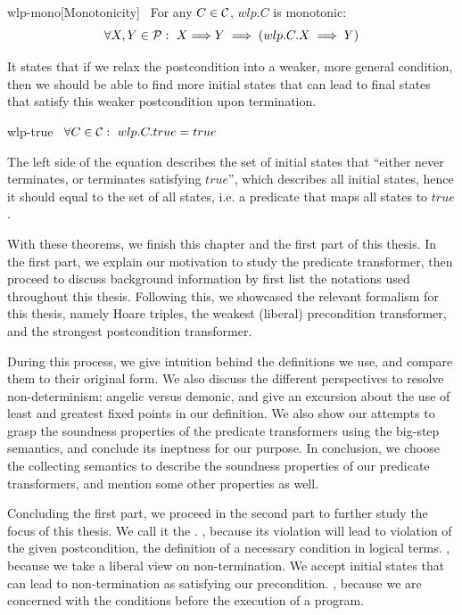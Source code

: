 \begin{theorem}{wlp-mono}[Monotonicity]~{\normalfont\cite{dijkstra90}} For any $C\in\mathcal{C}$, $wlp.C$ is monotonic:
  \[\forall X, Y \in\P:\ X{\implies} Y \implies (wlp.C.X\implies Y)\]
\end{theorem}
It states that if we relax the postcondition into a weaker, more general condition, then we should be able to find more initial states that can lead to final states that satisfy this weaker postcondition upon termination. 

\begin{theorem}{wlp-true}~{\normalfont\cite{dijkstra90}}
  $\forall C\in\mathcal{C}:\ wlp.C.true = true$
\end{theorem}
The left side of the equation describes the set of initial states that ``either never terminates, or terminates satisfying $true$'', which describes all initial states, hence it should equal to the set of all states, i.e. a predicate that maps all states to $true$.

With these theorems, we finish this chapter and the first part of this thesis. 
In the first part, we explain our motivation to study the predicate transformer, then proceed to discuss background information by first list the notations used throughout this thesis. 
Following this, we showcased the relevant formalism for this thesis, namely Hoare triples, the weakest (liberal) precondition transformer, and the strongest postcondition transformer. 

During this process, we give intuition behind the definitions we use, and compare them to their original form. 
We also discuss the different perspectives to resolve non-determinism: angelic versus demonic, and give an excursion about the use of least and greatest fixed points in our definition. 
We also show our attempts to grasp the soundness properties of the predicate transformers using the big-step semantics, and conclude its ineptness for our purpose. 
In conclusion, we choose the collecting semantics to describe the soundness properties of our predicate transformers, and mention some other properties as well. 

Concluding the first part, we proceed in the second part to further study the focus of this thesis. 
We call it the . 
, because its violation will lead to violation of the given postcondition, the definition of a necessary condition in logical terms. 
, because we take a liberal view on non-termination. We accept initial states that can lead to non-termination as satisfying our precondition. 
, because we are concerned with the conditions before the execution of a program. 


